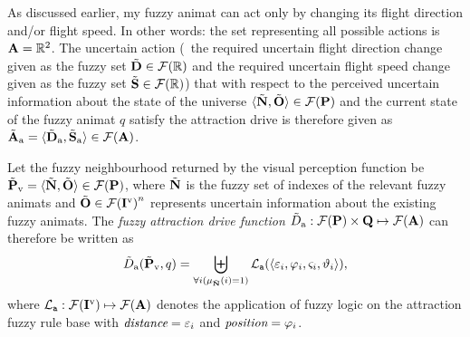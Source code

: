 As discussed earlier, my fuzzy animat can act only by changing its flight direction and/or flight speed. In other words: the set representing all possible actions is ${\mathbf{A}}=\mathbb{R}^2$. The uncertain action (\ie\ the required uncertain flight direction change given as the fuzzy set ${\tilde{{\mathbf{D}}}} \in {\ensuremath{\mathcal{F}(\mathbb{R})}}$ and the required uncertain flight speed change given as the fuzzy set ${\tilde{{\mathbf{S}}}} \in {\ensuremath{\mathcal{F}(\mathbb{R})}}$) that with respect to the perceived uncertain information about the state of the universe $\langle {\ensuremath{\tilde{{\mathbf{N}}}}}, {\tilde{{\mathbf{O}}}} \rangle \in {\ensuremath{\mathcal{F}({\mathbf{P}})}}$ and the current state of the fuzzy animat $q$ satisfy the attraction drive is therefore given as ${\tilde{{\mathbf{A}}}}_\mathrm{a}=\langle {\ensuremath{\tilde{{\mathbf{D}}}}}_\mathrm{a}, {\tilde{{\mathbf{S}}}}_\mathrm{a} \rangle \in {\ensuremath{\mathcal{F}({\mathbf{A}})}}$.

\begin{defn}
\label{def:fuzzyAnimat:Da:afd} 
Let the fuzzy neighbourhood returned by the visual perception function be ${\tilde{{\mathbf{P}}}}_\mathrm{v}=\langle {\ensuremath{\tilde{{\mathbf{N}}}}}, {\tilde{{\mathbf{O}}}} \rangle \in {\ensuremath{\mathcal{F}({\mathbf{P}})}}$, where ${\tilde{{\mathbf{N}}}}$ is the fuzzy set of indexes of the relevant fuzzy animats and ${\tilde{{\mathbf{O}}}} \in {\ensuremath{\mathcal{F}({\mathbf{I}}^\mathrm{v})}}^n$ represents uncertain information about the existing fuzzy animats. The \emph{fuzzy attraction drive function} ${\tilde{D}}_\mathrm{a}: {\mathcal{F}({\mathbf{P}})} \times {\ensuremath{\mathbf{Q}}} \mapsto {\ensuremath{\mathcal{F}({\mathbf{A}})}}$ can therefore be written as
\begin{equation}
\ffunc{D}_\mathrm{a}(\fset{P}_\mathrm{v},q)=%
 \biguplus_{\forall i(\mu_\fset{N}(i)=1)} \mathcal{L}_\texttt{a}(\langle \varepsilon_i, \varphi_i, \varsigma_i, \vartheta_i \rangle),
\end{equation}
where $\mathcal{L}_\texttt{a}: {\mathcal{F}({\mathbf{I}}^\mathrm{v})} \mapsto {\ensuremath{\mathcal{F}({\mathbf{A}})}}$ denotes the application of fuzzy logic on the attraction fuzzy rule base with $\emph{distance}=\varepsilon_i$ and $\emph{position}=\varphi_i$.
\end{defn}

